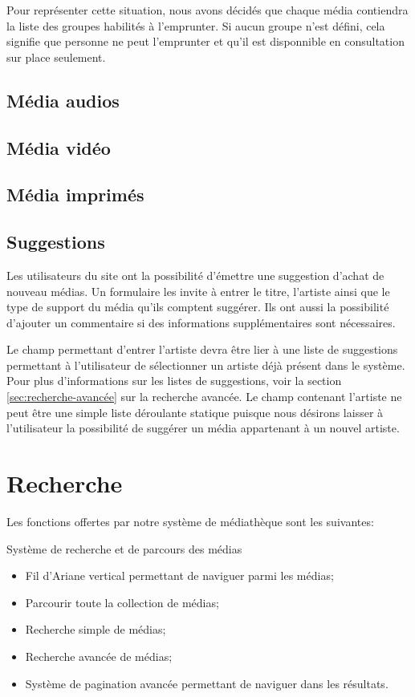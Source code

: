 \documentclass[letter, 11pt]{report}
\begin{document}
Pour représenter cette situation, nous avons décidés que chaque média contiendra la liste des groupes habilités à l'emprunter. Si aucun groupe n'est défini, cela signifie que personne ne peut l'emprunter et qu'il est disponnible en consultation sur place seulement.

\subsection{Média audios}

\subsection{Média vidéo}

\subsection{Média imprimés}

\subsection{Suggestions}
Les utilisateurs du site ont la possibilité d'émettre une suggestion d'achat de nouveau médias. Un formulaire les invite à entrer le titre, l'artiste ainsi que le type de support du média qu'ils comptent suggérer. Ils ont aussi la possibilité d'ajouter un commentaire si des informations supplémentaires sont nécessaires.

Le champ permettant d'entrer l'artiste devra être lier à une liste de suggestions permettant à l'utilisateur de sélectionner un artiste déjà présent dans le système. Pour plus d'informations sur les listes de suggestions, voir la section \ref{sec:recherche-avancée} sur la recherche avancée. Le champ contenant l'artiste ne peut être une simple liste déroulante statique puisque nous désirons laisser à l'utilisateur la possibilité de suggérer un média appartenant à un nouvel artiste.

\section{Recherche}

Les fonctions offertes par notre système de médiathèque sont les suivantes:

Système de recherche et de parcours des médias
\begin{itemize}
	\item Fil d'Ariane vertical permettant de naviguer parmi les médias;
	\item Parcourir toute la collection de médias;
	\item Recherche simple de médias;
	\item Recherche avancée de médias;
	\item Système de pagination avancée permettant de naviguer dans les résultats.
\end{itemize}
\end{document}
